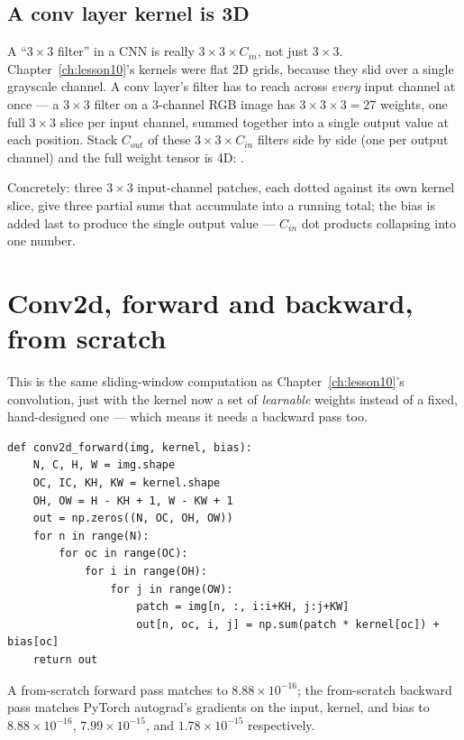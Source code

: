 \subsection*{A conv layer kernel is 3D}

A ``$3\times3$ filter'' in a CNN is really $3\times3\times C_{in}$, not just $3\times3$. Chapter~\ref{ch:lesson10}'s kernels were flat 2D grids, because they slid over a single grayscale channel. A conv layer's filter has to reach across \emph{every} input channel at once --- a $3\times3$ filter on a 3-channel RGB image has $3\times3\times3=27$ weights, one full $3\times3$ slice per input channel, summed together into a single output value at each position. Stack $C_{out}$ of these $3\times3\times C_{in}$ filters side by side (one per output channel) and the full weight tensor is 4D: .

Concretely: three $3\times3$ input-channel patches, each dotted against its own kernel slice, give three partial sums that accumulate into a running total; the bias is added last to produce the single output value --- $C_{in}$ dot products collapsing into one number.

\section{Conv2d, forward and backward, from scratch}

This is the same sliding-window computation as Chapter~\ref{ch:lesson10}'s convolution, just with the kernel now a set of \emph{learnable} weights instead of a fixed, hand-designed one --- which means it needs a backward pass too.

\begin{lstlisting}
def conv2d_forward(img, kernel, bias):
    N, C, H, W = img.shape
    OC, IC, KH, KW = kernel.shape
    OH, OW = H - KH + 1, W - KW + 1
    out = np.zeros((N, OC, OH, OW))
    for n in range(N):
        for oc in range(OC):
            for i in range(OH):
                for j in range(OW):
                    patch = img[n, :, i:i+KH, j:j+KW]
                    out[n, oc, i, j] = np.sum(patch * kernel[oc]) + bias[oc]
    return out
\end{lstlisting}

A from-scratch forward pass matches  to $8.88\times10^{-16}$; the from-scratch backward pass matches PyTorch autograd's gradients on the input, kernel, and bias to $8.88\times10^{-16}$, $7.99\times10^{-15}$, and $1.78\times10^{-15}$ respectively.

